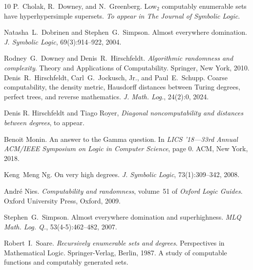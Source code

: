 \documentclass[10pt,a4paper]{amsart}
\begin{document}
\begin{thebibliography}{10}
  P.~Cholak, R.~Downey, and  N.~Greenberg.
  {\newblock}Low{$_2$} computably enumerable sets have hyperhypersimple
  supersets. {\newblock}\textit{To appear in The Journal of Symbolic
  Logic}.{\newblock}
  
  Natasha~L.~Dobrinen  and  Stephen~G.~Simpson.
  {\newblock}Almost everywhere domination. {\newblock}\textit{J. Symbolic
  Logic}, 69(3):914--922, 2004.{\newblock}
  
  Rodney~G.~Downey  and  Denis~R.~Hirschfeldt.
  {\newblock}\textit{Algorithmic randomness and complexity}.
  {\newblock}Theory and Applications of Computability. Springer, New York,
  2010.{\newblock}
  Denis~R.~Hirschfeldt, Carl~G.~Jockusch, Jr., and 
  Paul~E.~Schupp. {\newblock}Coarse computability, the density metric,
  Hausdorff distances between Turing degrees, perfect trees, and reverse
  mathematics. {\newblock}\textit{J. Math. Log.}, 24(2):0, 2024.{\newblock}

Denis R. Hirschfeldt and Tiago Royer,
\emph{Diagonal noncomputability and distances between degrees},
to appear.
  
  Benoit Monin. {\newblock}An answer to the Gamma
  question. {\newblock}In \textit{LICS '18---33rd Annual ACM/IEEE Symposium
  on Logic in Computer Science},  page  0. ACM, New York, 2018.{\newblock}
  
  Keng~Meng Ng. {\newblock}On very high degrees.
  {\newblock}\textit{J. Symbolic Logic}, 73(1):309--342, 2008.{\newblock}
  
  Andr{\'e} Nies. {\newblock}\textit{Computability
  and randomness},  volume~51  of \textit{Oxford Logic Guides}.
  {\newblock}Oxford University Press, Oxford, 2009.{\newblock}
  
  Stephen~G.~Simpson. {\newblock}Almost everywhere
  domination and superhighness. {\newblock}\textit{MLQ Math. Log. Q.},
  53(4-5):462--482, 2007.{\newblock}
  
  Robert~I.~Soare. {\newblock}\textit{Recursively
  enumerable sets and degrees}. {\newblock}Perspectives in Mathematical Logic.
  Springer-Verlag, Berlin, 1987. {\newblock}A study of computable functions
  and computably generated sets.{\newblock}
\end{thebibliography}
\end{document}
